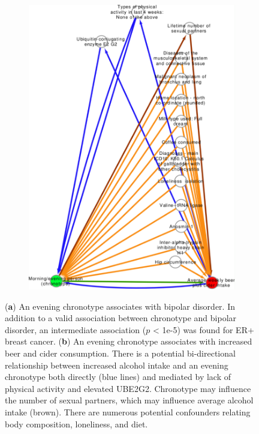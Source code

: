 \documentclass[genes,article,accept,moreauthors,pdftex]{Definitions/mdpi}
\begin{document}
\begin{paracol}{2}
\begin{figure}[H]
{\begin{subfigure}{.65\linewidth}
	\includegraphics[width=0.95\linewidth,keepaspectratio]{Figs/Analysis3/new_chrono_beer.pdf}
\caption{}
\label{chronoBeer}
\end{subfigure}}
\caption{(\textbf{a}) An evening chronotype associates with bipolar disorder. In addition to a valid association between chronotype and bipolar disorder, an intermediate association ($p$ < 1e-5) was found for ER+ breast cancer. (\textbf{b}) An evening chronotype associates with increased beer and cider consumption. There is a potential bi-directional relationship between increased alcohol intake and an evening chronotype both directly (blue lines) and mediated by lack of physical activity and elevated UBE2G2. Chronotype may influence the number of sexual partners, which may influence average alcohol intake ({brown}). There are numerous potential confounders relating body composition, loneliness, and diet.}
\label{chronoBeerBipolar}
\end{figure}





\end{paracol}
\end{document}
